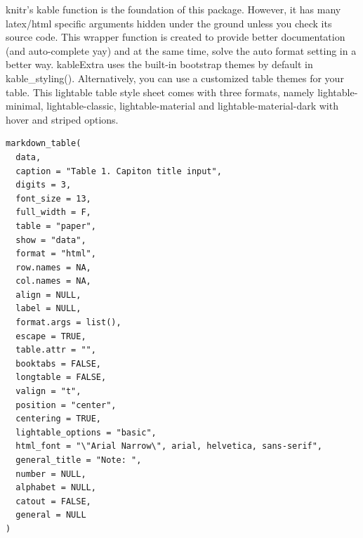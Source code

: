 \documentclass[a4paper]{book}
\begin{document}
%
\begin{Description}
knitr's kable function is the foundation of this package. However, it has many latex/html specific arguments hidden under the ground unless you check its source code. This wrapper function is created to provide better documentation (and auto-complete yay) and at the same time, solve the auto format setting in a better way.
kableExtra uses the built-in bootstrap themes by default in kable\_styling(). Alternatively, you can use a customized table themes for your table. This lightable table style sheet comes with three formats, namely lightable-minimal, lightable-classic, lightable-material and lightable-material-dark with hover and striped options.
\end{Description}
%
\begin{Usage}
\begin{verbatim}
markdown_table(
  data,
  caption = "Table 1. Capiton title input",
  digits = 3,
  font_size = 13,
  full_width = F,
  table = "paper",
  show = "data",
  format = "html",
  row.names = NA,
  col.names = NA,
  align = NULL,
  label = NULL,
  format.args = list(),
  escape = TRUE,
  table.attr = "",
  booktabs = FALSE,
  longtable = FALSE,
  valign = "t",
  position = "center",
  centering = TRUE,
  lightable_options = "basic",
  html_font = "\"Arial Narrow\", arial, helvetica, sans-serif",
  general_title = "Note: ",
  number = NULL,
  alphabet = NULL,
  catout = FALSE,
  general = NULL
)
\end{verbatim}
\end{Usage}
%
\end{document}
